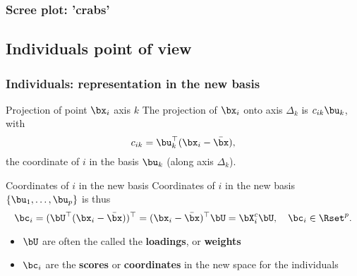 \begin{frame}[fragile]
  \frametitle{Scree plot: 'crabs'}

\begin{knitrout}
\color{fgcolor}
\end{knitrout}

\end{frame}

\subsection{Individuals point of view}

\begin{frame}
  \frametitle{Individuals: representation in the new basis}

  \begin{block}{Projection of point $\bx_i$ axis $k$}
    The projection of $\bx_i$ onto axis $\Delta_k$ is $c_{ik} \bu_k$, with 
    \begin{equation*}
      c_{ik} = \bu_k^\top (\bx_i - \bar{\bx}),
    \end{equation*}
     the coordinate of $i$ in the basis $\bu_k$ (along axis $\Delta_k$).
  \end{block}

  \begin{block}{Coordinates of $i$ in the new basis}
    Coordinates of $i$ in the new basis $\{\bu_1, \dots, \bu_p\}$ is thus 
    \begin{equation*}
      \bc_i  = (\bU^\top (\bx_i - \bar{\bx}))^\top = (\bx_i - \bar{\bx})^\top \bU = \bX^c_i \bU, \quad \bc_i \in \Rset^p.
    \end{equation*}

    \begin{itemize}
      \item \alert{$\bU$ are often the called the \textbf{loadings}, or \textbf{weights}}
      \item \alert{$ \bc_i$ are the \textbf{scores} or \textbf{coordinates} in the new space for the individuals}
    \end{itemize}
  \end{block}
\end{frame}


